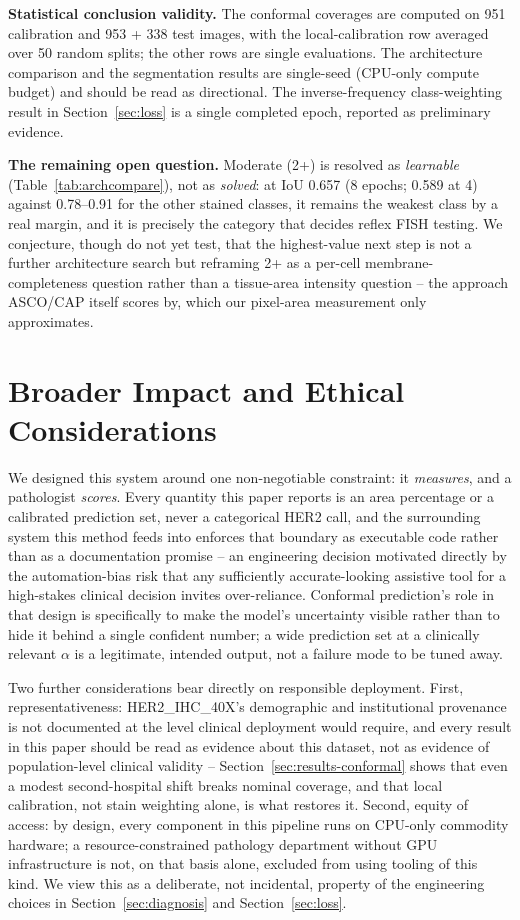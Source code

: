\documentclass[conference]{IEEEtran}
\begin{document}
\textbf{Statistical conclusion validity.} The conformal coverages are
computed on 951 calibration and 953 + 338 test images, with the local-calibration
row averaged over 50 random splits; the other rows are single evaluations.
The architecture comparison and the segmentation results are single-seed (CPU-only
compute budget) and should be read as directional. The inverse-frequency
class-weighting result in Section~\ref{sec:loss} is a single completed epoch,
reported as preliminary evidence.

\textbf{The remaining open question.} Moderate (2+) is resolved as
\emph{learnable} (Table~\ref{tab:archcompare}), not as \emph{solved}: at
IoU 0.657 (8 epochs; 0.589 at 4) against 0.78--0.91 for the other stained classes, it remains the
weakest class by a real margin, and it is precisely the category that
decides reflex FISH testing. We conjecture, though do not yet test, that
the highest-value next step is not a further architecture search but
reframing 2+ as a per-cell membrane-completeness question rather than a
tissue-area intensity question -- the approach ASCO/CAP itself scores by,
which our pixel-area measurement only approximates.

\section{Broader Impact and Ethical Considerations}

We designed this system around one non-negotiable constraint: it
\emph{measures}, and a pathologist \emph{scores}. Every quantity this
paper reports is an area percentage or a calibrated prediction set, never
a categorical HER2 call, and the surrounding system this method feeds into
enforces that boundary as executable code rather than as a documentation
promise -- an engineering decision motivated directly by the automation-bias
risk that any sufficiently accurate-looking assistive tool for a
high-stakes clinical decision invites over-reliance. Conformal
prediction's role in that design is specifically to make the model's
uncertainty visible rather than to hide it behind a single confident
number; a wide prediction set at a clinically relevant $\alpha$ is a
legitimate, intended output, not a failure mode to be tuned away.

Two further considerations bear directly on responsible deployment. First,
representativeness: HER2\_IHC\_40X's demographic and institutional
provenance is not documented at the level clinical deployment would
require, and every result in this paper should be read as evidence about
this dataset, not as evidence of population-level clinical validity --
Section~\ref{sec:results-conformal} shows that even a modest second-hospital shift breaks nominal coverage, and that local calibration, not stain weighting alone, is what restores it. Second,
equity of access: by design, every component in this pipeline runs on
CPU-only commodity hardware; a resource-constrained pathology department
without GPU infrastructure is not, on that basis alone, excluded from
using tooling of this kind. We view this as a deliberate, not incidental,
property of the engineering choices in Section~\ref{sec:diagnosis} and
Section~\ref{sec:loss}.
\end{document}
